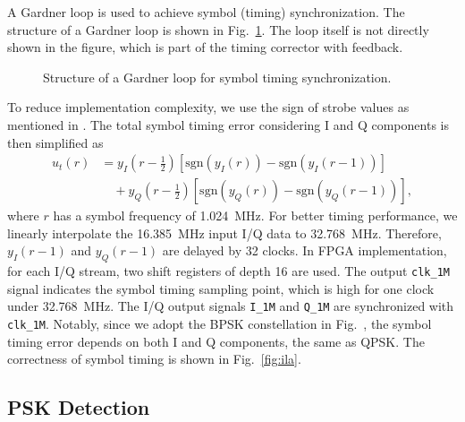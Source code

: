 \documentclass[journal,twoside]{IEEEtran}
\begin{document}
      A Gardner loop \cite{gardner1986bpsk} is used to achieve symbol (timing) synchronization.
      The structure of a Gardner loop is shown in Fig.~\ref{fig:gardner_loop}.
      The loop itself is not directly shown in the figure,
      which is part of the timing corrector with feedback.
      \begin{figure}[htbp]
        
        \caption{Structure of a Gardner loop for symbol timing synchronization.}
        \label{fig:gardner_loop}
      \end{figure}

      To reduce implementation complexity, we use the sign of strobe values as mentioned in \cite{gardner1986bpsk}.
      The total symbol timing error considering I and Q components is then simplified as
      \begin{equation}
        \begin{aligned}
          u_t(r)&=y_I(r-\tfrac12)\left[\mathrm{sgn}\left(y_I(r)\right)-\mathrm{sgn}\left(y_I(r-1)\right)\right] \\
          &\quad{}+y_Q(r-\tfrac12)\left[\mathrm{sgn}\left(y_Q(r)\right)-\mathrm{sgn}\left(y_Q(r-1)\right)\right],
        \end{aligned}
      \end{equation}
      where $r$ has a symbol frequency of \qty{1.024}{MHz}.
      For better timing performance, we linearly interpolate the \qty{16.385}{MHz} input I/Q data to \qty{32.768}{MHz}.
      Therefore, $y_I(r-1)$ and $y_Q(r-1)$ are delayed by 32 clocks.
      In FPGA implementation, for each I/Q stream, two shift registers of depth 16 are used.
      The output \texttt{clk\_1M} signal indicates the symbol timing sampling point,
      which is high for one clock under \qty{32.768}{MHz}.
      The I/Q output signals \texttt{I\_1M} and \texttt{Q\_1M} are synchronized with \texttt{clk\_1M}.
      Notably, since we adopt the BPSK constellation in Fig.~,
      the symbol timing error depends on both I and Q components, the same as QPSK.
      The correctness of symbol timing is shown in Fig.~\ref{fig:ila}.

    \subsection{PSK Detection}
\end{document}
